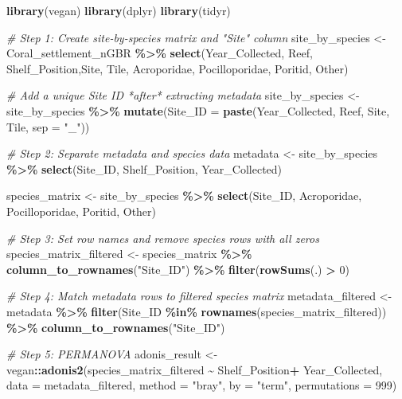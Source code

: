 \documentclass[
]{article}
\newenvironment{Shaded}{\begin{snugshade}}{\end{snugshade}}
\newcommand{\AttributeTok}[1]{\textcolor[rgb]{0.13,0.29,0.53}{#1}}
\newcommand{\CommentTok}[1]{\textcolor[rgb]{0.56,0.35,0.01}{\textit{#1}}}
\newcommand{\DecValTok}[1]{\textcolor[rgb]{0.00,0.00,0.81}{#1}}
\newcommand{\FunctionTok}[1]{\textcolor[rgb]{0.13,0.29,0.53}{\textbf{#1}}}
\newcommand{\NormalTok}[1]{#1}
\newcommand{\OtherTok}[1]{\textcolor[rgb]{0.56,0.35,0.01}{#1}}
\newcommand{\SpecialCharTok}[1]{\textcolor[rgb]{0.81,0.36,0.00}{\textbf{#1}}}
\newcommand{\StringTok}[1]{\textcolor[rgb]{0.31,0.60,0.02}{#1}}
\begin{document}
\begin{Shaded}
\begin{Highlighting}[]
\FunctionTok{library}\NormalTok{(vegan)}
\FunctionTok{library}\NormalTok{(dplyr)}
\FunctionTok{library}\NormalTok{(tidyr)}

\CommentTok{\# Step 1: Create site{-}by{-}species matrix and "Site" column}
\NormalTok{site\_by\_species }\OtherTok{\textless{}{-}}\NormalTok{ Coral\_settlement\_nGBR }\SpecialCharTok{\%\textgreater{}\%}
  \FunctionTok{select}\NormalTok{(Year\_Collected, Reef, Shelf\_Position,Site, Tile, Acroporidae, Pocilloporidae, Poritid, Other) }

\CommentTok{\# Add a unique Site ID *after* extracting metadata}
\NormalTok{site\_by\_species }\OtherTok{\textless{}{-}}\NormalTok{ site\_by\_species }\SpecialCharTok{\%\textgreater{}\%}
  \FunctionTok{mutate}\NormalTok{(}\AttributeTok{Site\_ID =} \FunctionTok{paste}\NormalTok{(Year\_Collected, Reef, Site, Tile, }\AttributeTok{sep =} \StringTok{"\_"}\NormalTok{))}

\CommentTok{\# Step 2: Separate metadata and species data}
\NormalTok{metadata }\OtherTok{\textless{}{-}}\NormalTok{ site\_by\_species }\SpecialCharTok{\%\textgreater{}\%}
  \FunctionTok{select}\NormalTok{(Site\_ID, Shelf\_Position, Year\_Collected)}

\NormalTok{species\_matrix }\OtherTok{\textless{}{-}}\NormalTok{ site\_by\_species }\SpecialCharTok{\%\textgreater{}\%}
  \FunctionTok{select}\NormalTok{(Site\_ID, Acroporidae, Pocilloporidae, Poritid, Other)}

\CommentTok{\# Step 3: Set row names and remove species rows with all zeros}
\NormalTok{species\_matrix\_filtered }\OtherTok{\textless{}{-}}\NormalTok{ species\_matrix }\SpecialCharTok{\%\textgreater{}\%}
  \FunctionTok{column\_to\_rownames}\NormalTok{(}\StringTok{"Site\_ID"}\NormalTok{) }\SpecialCharTok{\%\textgreater{}\%}
  \FunctionTok{filter}\NormalTok{(}\FunctionTok{rowSums}\NormalTok{(.) }\SpecialCharTok{\textgreater{}} \DecValTok{0}\NormalTok{)}

\CommentTok{\# Step 4: Match metadata rows to filtered species matrix}
\NormalTok{metadata\_filtered }\OtherTok{\textless{}{-}}\NormalTok{ metadata }\SpecialCharTok{\%\textgreater{}\%}
  \FunctionTok{filter}\NormalTok{(Site\_ID }\SpecialCharTok{\%in\%} \FunctionTok{rownames}\NormalTok{(species\_matrix\_filtered)) }\SpecialCharTok{\%\textgreater{}\%}
  \FunctionTok{column\_to\_rownames}\NormalTok{(}\StringTok{"Site\_ID"}\NormalTok{)}

\CommentTok{\# Step 5: PERMANOVA}
\NormalTok{adonis\_result }\OtherTok{\textless{}{-}}\NormalTok{ vegan}\SpecialCharTok{::}\FunctionTok{adonis2}\NormalTok{(species\_matrix\_filtered }\SpecialCharTok{\textasciitilde{}}\NormalTok{ Shelf\_Position}\SpecialCharTok{+}\NormalTok{ Year\_Collected,}
                                \AttributeTok{data =}\NormalTok{ metadata\_filtered,}
                                \AttributeTok{method =} \StringTok{"bray"}\NormalTok{,}
                                \AttributeTok{by =} \StringTok{"term"}\NormalTok{,}
                                \AttributeTok{permutations =} \DecValTok{999}\NormalTok{)}


\end{Highlighting}
\end{Shaded}
\end{document}
